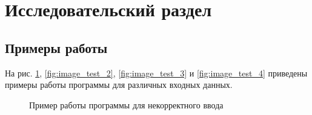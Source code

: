 \documentclass[a4paper,12pt]{article}
\begin{document}
\pagebreak

\section{Исследовательский раздел}

    
    \subsection{Примеры работы}
        
        На рис. \ref{fig:image_test_1}, \ref{fig:image_test_2}, \ref{fig:image_test_3} и \ref{fig:image_test_4} приведены примеры работы программы для различных входных данных. 
        
        	\begin{figure}[h!]
                \caption{Пример работы программы для некорректного ввода}
                \label{fig:image_test_1}
            \end{figure}
            
\end{document}
